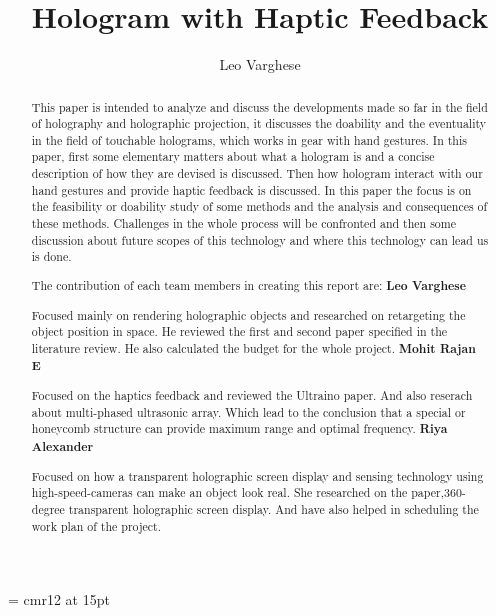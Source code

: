 \documentclass{fisatproject}
\title{Hologram with Haptic Feedback}
\author{Leo Varghese}
\begin{document}
\maketitle
\makecert
\font\secfont =  cmr12 at 15pt
\newpage
{}
\setcounter{page}{1}
\thispagestyle{plain}
\renewcommand\abstractname{ABSTRACT}
\begin{abstract}
\vspace{5cm}
This paper is intended to analyze and discuss the developments made so far in the field of holography and holographic projection, it discusses the doability and the eventuality in the field of touchable holograms, which works in gear with hand gestures. In this paper, first some elementary matters about what a hologram is and a concise description of how they are devised is discussed. Then how hologram interact with our hand gestures and provide haptic feedback is discussed. In this paper the focus is on the feasibility or doability study of some methods and the analysis and consequences of these methods. Challenges in the whole process will be confronted and then some discussion about future scopes of this technology and where this technology can lead us is done.
\end{abstract}



\newpage
\renewcommand\abstractname{Contribution}
\thispagestyle{plain}
\begin{abstract}
\vspace{5cm}
The contribution of each team members in creating this report are:
\newline
\newline
\textbf{Leo Varghese}
\newline
\par  Focused mainly on rendering holographic objects and researched on retargeting the object position in space.
He reviewed the first and second paper specified in the literature review.
He also calculated the budget for the whole project.
\vspace{0.5cm}
\newline
\textbf{Mohit Rajan E}
\newline
\par Focused on the haptics feedback and reviewed the Ultraino paper. And also reserach about multi-phased ultrasonic array. Which lead to the conclusion that a special or honeycomb structure can provide maximum range and optimal frequency.
\vspace{0.5cm}
\newline
\textbf{Riya Alexander}
\newline
\par Focused on how a transparent holographic screen display and sensing technology using high-speed-cameras can make an object look real.
She researched on the paper,360-degree transparent holographic screen display. And have also helped in scheduling the work plan of the project.
\end{abstract}
\end{document}
